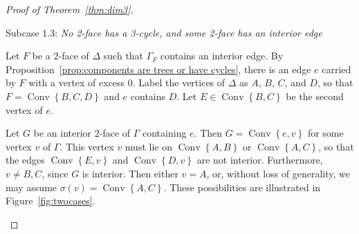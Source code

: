 \documentclass[ALCO,ThmDefs,Unicode,epreuves]{cedram}
\DeclareMathOperator{\Convop}{Conv}
\newcommand{\Conv}[1]{\Convop\left\{{#1}\right\}}
\newenvironment{proofsection}[2]{\begin{enonce*}[remark]{#1 \emph{#2}} \ }{\end{enonce*}}
\begin{document}
\begin{proof}[Proof of Theorem~\ref{thm:dim3}]
\begin{proofsection}{Subcase 1.3:}{No 2-face has a 3-cycle, and some 2-face has an interior edge}

Let $F$ be a $2$-face of $\Delta$ such that $\Gamma_F$ contains an interior edge. By Proposition~\ref{prop:components are trees or have cycles}, there is an edge $e$ carried by $F$ with a vertex of excess 0. Label the vertices of $\Delta$ as $A$, $B$, $C$, and $D$, so that $F = \Conv{B,C,D}$ and $e$ contains $D$. Let $E \in \Conv{B,C}$ be the second vertex of $e$.

Let $G$ be an interior 2-face of $\Gamma$ containing $e$. Then $G=\Conv{e,v}$ for some vertex $v$ of $\Gamma$. This vertex $v$ must lie on $\Conv{A,B}$ or $\Conv{A,C}$, so that the edges $\Conv{E,v}$ and $\Conv{D,v}$ are not interior. Furthermore, $v\ne B,C$, since $G$ is interior. Then either $v=A$, or, without loss of generality, we may assume $\sigma(v)=\Conv{A,C}$. These possibilities are illustrated in Figure~\ref{fig:twocases}.


\end{proofsection}
\end{proof}
\end{document}
